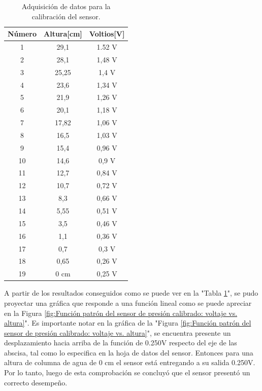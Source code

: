 \begin{table}[h]
	\centering
	\caption[Adquisición de datos para la calibración del sensor]{Adquisición de datos para la calibración del sensor.}
	\begin{tabular}{c c c}    
		\toprule
		\textbf{Número}     & \textbf{Altura[cm]} & \textbf{Voltios[V]} \\
		\midrule
		1  & 29,1          &  1.52 V \\		
		2  & 28,1          &  1,48 V \\
		3  & 25,25         &  1,4 V \\
		4  & 23,6          &  1,34 V \\
		5  & 21,9          & 1,26 V \\
		6  & 20,1          & 1,18 V \\
		7  & 17,82         & 1,06 V \\
		8  & 16,5          & 1,03 V \\
		9  & 15,4          & 0,96 V \\
		10 & 14,6          & 0,9 V \\
		11 & 12,7          & 0,84 V \\
		12 & 10,7          & 0,72 V \\
		13 & 8,3           & 0,66  V \\
		14 & 5,55          & 0,51 V \\
		15 & 3,5           & 0,46 V \\
		16 & 1,1           & 0,36 V \\
		17 & 0,7           & 0,3 V \\
		18 & 0,65          & 0,26 V \\
		19 & 0 cm          & 0,25 V \\
	
		\bottomrule
		\hline
	\end{tabular}
	\label{tab:calibración del sensor-función patrón}
\end{table}

A partir de los resultados conseguidos como se puede ver en la "Tabla \ref{tab:calibración del sensor-función patrón}", se pudo proyectar una gráfica que responde a una función lineal como se puede apreciar en la Figura \ref{fig:Función patrón del sensor de presión calibrado: voltaje vs. altura}". 
Es importante notar en la gráfica de la "Figura \ref{fig:Función patrón del sensor de presión calibrado: voltaje vs. altura}", se encuentra presente un desplazamiento hacia arriba de la función de 0.250V respecto del eje de las abscisa, tal como lo especifica en la hoja de datos del sensor. Entonces para una altura de columna de agua de 0 cm el sensor está entregando a su salida 0.250V. 
Por lo tanto, luego de esta comprobación se concluyó que el sensor presentó un correcto desempeño.

